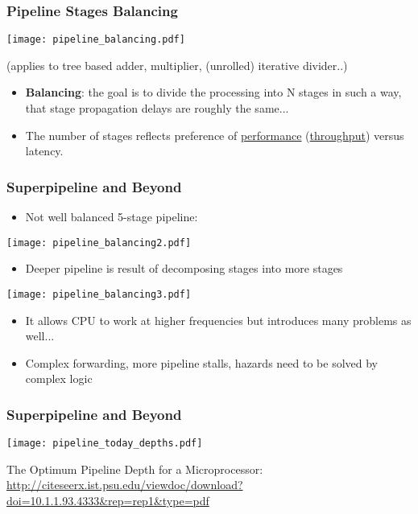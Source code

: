 \documentclass{beamer}
\begin{document}
\begin{frame}
\frametitle{Pipeline Stages Balancing}
\texttt{[image: pipeline\_balancing.pdf]}

(applies to tree based adder, multiplier, (unrolled) iterative divider..)

\begin{itemize}
 \item \textbf{Balancing}: the goal is to divide the processing into N stages in such a way, that stage propagation delays are roughly the same...
 \item The number of stages reflects preference of \underline{performance} (\underline{throughput}) versus latency.
\end{itemize}

\end{frame}

\begin{frame}
\frametitle{Superpipeline and Beyond}

\begin{itemize}
 \item Not well balanced 5-stage pipeline:
\end{itemize}

\texttt{[image: pipeline\_balancing2.pdf]}

\begin{itemize}
 \item Deeper pipeline is result of decomposing stages into more stages
\end{itemize}

\texttt{[image: pipeline\_balancing3.pdf]}

\begin{itemize}
 \item It allows CPU to work at higher frequencies but introduces many problems as well...
 \item Complex forwarding, more pipeline stalls, hazards need to be solved by complex logic
\end{itemize}

\end{frame}

\begin{frame}
\frametitle{Superpipeline and Beyond}

\texttt{[image: pipeline\_today\_depths.pdf]}

The Optimum Pipeline Depth for a Microprocessor: {\tiny \url{http://citeseerx.ist.psu.edu/viewdoc/download?doi=10.1.1.93.4333\&rep=rep1\&type=pdf}}

\end{frame}
\end{document}
